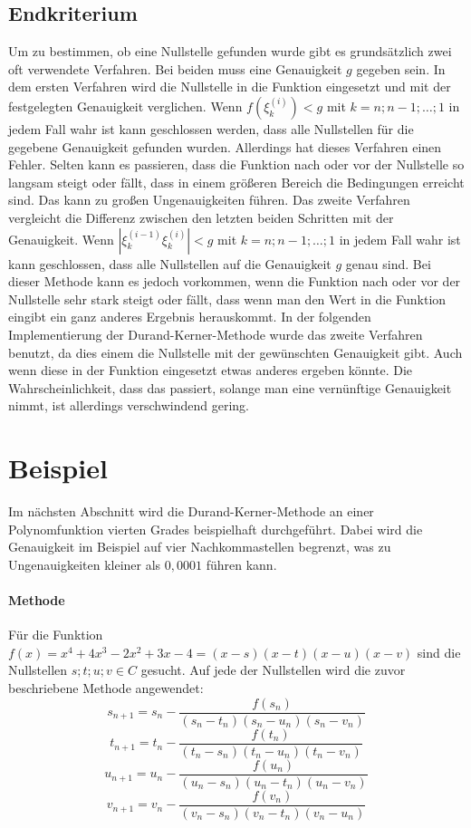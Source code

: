 \documentclass[12pt]{article}
\begin{document}
\subsection{Endkriterium}
Um zu bestimmen, ob eine Nullstelle gefunden wurde gibt es grundsätzlich zwei oft verwendete Verfahren. Bei beiden muss eine Genauigkeit $g$ gegeben sein. 
In dem ersten Verfahren wird die Nullstelle in die Funktion eingesetzt und mit der festgelegten Genauigkeit verglichen. Wenn $f(\xi_k^{(i)}) < g$ mit $k=n;n-1;\dots ;1$ in jedem Fall wahr ist kann geschlossen werden, dass alle Nullstellen für die gegebene Genauigkeit gefunden wurden. Allerdings hat dieses Verfahren einen Fehler. Selten kann es passieren, dass die Funktion nach oder vor der Nullstelle so langsam steigt oder fällt, dass in einem größeren Bereich die Bedingungen erreicht sind. Das kann zu großen Ungenauigkeiten führen. Das zweite Verfahren vergleicht die Differenz zwischen den letzten beiden Schritten mit der Genauigkeit. Wenn $|\xi_k^{(i-1)}\xi_k^{(i)}| < g$ mit $k=n;n-1;\dots ;1$ in jedem Fall wahr ist kann geschlossen, dass alle Nullstellen auf die Genauigkeit $g$ genau sind. Bei dieser Methode kann es jedoch vorkommen, wenn die Funktion nach oder vor der Nullstelle sehr stark steigt oder fällt, dass wenn man den Wert in die Funktion eingibt ein ganz anderes Ergebnis herauskommt. In der folgenden Implementierung der Durand-Kerner-Methode wurde das zweite Verfahren benutzt, da dies einem die Nullstelle mit der gewünschten Genauigkeit gibt. Auch wenn diese in der Funktion eingesetzt etwas anderes ergeben könnte. Die Wahrscheinlichkeit, dass das passiert, solange man eine vernünftige Genauigkeit nimmt, ist allerdings verschwindend gering. 

\section{Beispiel}
Im nächsten Abschnitt wird die Durand-Kerner-Methode an einer Polynomfunktion vierten Grades beispielhaft durchgeführt. Dabei wird die Genauigkeit im Beispiel auf vier Nachkommastellen begrenzt, was zu Ungenauigkeiten kleiner als $0,0001$ führen kann.
\paragraph{Methode}
Für die Funktion $f(x) = x^4 + 4x^3 - 2x^2 + 3x - 4 = (x-s)(x-t)(x-u)(x-v)$ sind die Nullstellen $s;t;u;v \in C$ gesucht. Auf jede der Nullstellen wird die zuvor beschriebene Methode angewendet:
\[s_{n+1} = s_n-\frac{f(s_n)}{(s_n-t_n)(s_n-u_n)(s_n-v_n)}\]
\[t_{n+1} = t_n-\frac{f(t_n)}{(t_n-s_n)(t_n-u_n)(t_n-v_n)}\]
\[u_{n+1} = u_n-\frac{f(u_n)}{(u_n-s_n)(u_n-t_n)(u_n-v_n)}\]
\[v_{n+1} = v_n-\frac{f(v_n)}{(v_n-s_n)(v_n-t_n)(v_n-u_n)}\]
\end{document}
